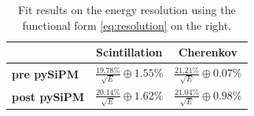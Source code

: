 \begin{table}
	\centering
	\begin{tabular}{lcc}
		\toprule
		& \textbf{Scintillation} & \textbf{Cherenkov} \\
		\midrule
		\textbf{pre pySiPM} &	$\frac{19.78\%}{\sqrt{E}}\oplus1.55\%$ 	& $\frac{21.21\%}{\sqrt{E}}\oplus0.07\%$ \\
		\textbf{post pySiPM} & $\frac{20.14\%}{\sqrt{E}}\oplus1.62\%$ 	& $\frac{21.04\%}{\sqrt{E}}\oplus0.98\%$ \\
		\bottomrule
	\end{tabular}
	\caption{Fit results on the energy resolution using the functional form \ref{eq:resolution} on the right.}
	\label{tab:res_quadratic_sum}
\end{table}